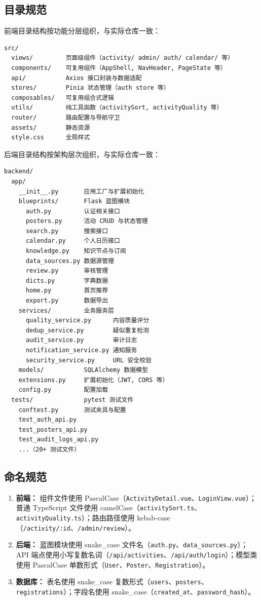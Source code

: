 \documentclass[12pt,a4paper]{ctexart}
\begin{document}
\subsection{目录规范}
前端目录结构按功能分层组织，与实际仓库一致：
\begin{verbatim}
src/
  views/         页面级组件（activity/ admin/ auth/ calendar/ 等）
  components/    可复用组件（AppShell, NavHeader, PageState 等）
  api/           Axios 接口封装与数据适配
  stores/        Pinia 状态管理（auth store 等）
  composables/   可复用组合式逻辑
  utils/         纯工具函数（activitySort, activityQuality 等）
  router/        路由配置与导航守卫
  assets/        静态资源
  style.css      全局样式
\end{verbatim}
后端目录结构按架构层次组织，与实际仓库一致：
\begin{verbatim}
backend/
  app/
    __init__.py       应用工厂与扩展初始化
    blueprints/       Flask 蓝图模块
      auth.py         认证相关接口
      posters.py      活动 CRUD 与状态管理
      search.py       搜索接口
      calendar.py     个人日历接口
      knowledge.py    知识节点与订阅
      data_sources.py 数据源管理
      review.py       审核管理
      dicts.py        字典数据
      home.py         首页推荐
      export.py       数据导出
    services/         业务服务层
      quality_service.py      内容质量评分
      dedup_service.py        疑似重复检测
      audit_service.py        审计日志
      notification_service.py 通知服务
      security_service.py     URL 安全校验
    models/           SQLAlchemy 数据模型
    extensions.py     扩展初始化（JWT, CORS 等）
    config.py         配置加载
  tests/              pytest 测试文件
    conftest.py       测试夹具与配置
    test_auth_api.py
    test_posters_api.py
    test_audit_logs_api.py
    ...（20+ 测试文件）
\end{verbatim}

\subsection{命名规范}
\begin{enumerate}
\item \textbf{前端：} 组件文件使用 PascalCase（\texttt{ActivityDetail.vue}、\texttt{LoginView.vue}）；普通 TypeScript 文件使用 camelCase（\texttt{activitySort.ts}、\texttt{activityQuality.ts}）；路由路径使用 kebab-case（\texttt{/activity/:id}、\texttt{/admin/review}）。
\item \textbf{后端：} 蓝图模块使用 snake\_case 文件名（\texttt{auth.py}、\texttt{data\_sources.py}）；API 端点使用小写复数名词（\texttt{/api/activities}、\texttt{/api/auth/login}）；模型类使用 PascalCase 单数形式（\texttt{User}、\texttt{Poster}、\texttt{Registration}）。
\item \textbf{数据库：} 表名使用 snake\_case 复数形式（\texttt{users}、\texttt{posters}、\texttt{registrations}）；字段名使用 snake\_case（\texttt{created\_at}、\texttt{password\_hash}）。
\end{enumerate}
\end{document}
